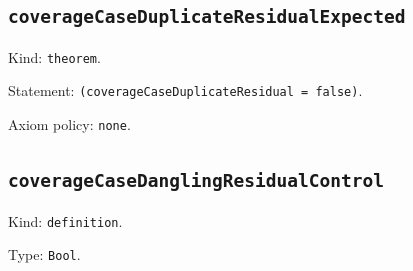 \documentclass[11pt]{article}
\begin{document}
\subsection*{\texttt{coverageCaseDuplicateResidualExpected}}
\noindent Kind: \texttt{theorem}.\par
\noindent Statement: \texttt{(coverageCaseDuplicateResidual = false)}.\par
\noindent Axiom policy: \texttt{none}.\par
\subsection*{\texttt{coverageCaseDanglingResidualControl}}
\noindent Kind: \texttt{definition}.\par
\noindent Type: \texttt{Bool}.\par
\end{document}
